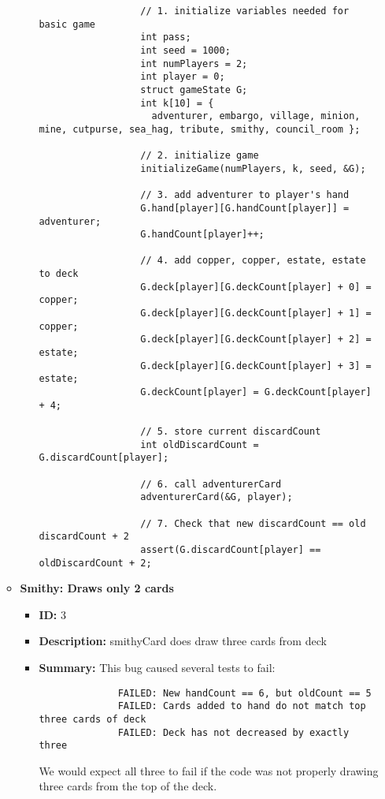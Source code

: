 \documentclass[11pt,letterpaper]{article}
\begin{document}
\begin{enumerate}[label=\Roman*.]
\begin{itemize}[label=]
\begin{itemize}[label=]
                \begin{lstlisting}
                  // 1. initialize variables needed for basic game
                  int pass;                             
                  int seed = 1000;                      
                  int numPlayers = 2;                   
                  int player = 0;                       
                  struct gameState G;
                  int k[10] = {
                    adventurer, embargo, village, minion, mine, cutpurse, sea_hag, tribute, smithy, council_room }; 

                  // 2. initialize game
                  initializeGame(numPlayers, k, seed, &G);

                  // 3. add adventurer to player's hand
                  G.hand[player][G.handCount[player]] = adventurer;
                  G.handCount[player]++;

                  // 4. add copper, copper, estate, estate to deck
                  G.deck[player][G.deckCount[player] + 0] = copper;
                  G.deck[player][G.deckCount[player] + 1] = copper;
                  G.deck[player][G.deckCount[player] + 2] = estate;
                  G.deck[player][G.deckCount[player] + 3] = estate;
                  G.deckCount[player] = G.deckCount[player] + 4;

                  // 5. store current discardCount
                  int oldDiscardCount = G.discardCount[player];

                  // 6. call adventurerCard
                  adventurerCard(&G, player);

                  // 7. Check that new discardCount == old discardCount + 2
                  assert(G.discardCount[player] == oldDiscardCount + 2;
                \end{lstlisting}

        \end{itemize}

      \item \textbf{Smithy: Draws only 2 cards}
        \begin{itemize}[label=]
          \item \textbf{ID:} 3
          \item \textbf{Description:} smithyCard does draw three cards
            from deck
          \item \textbf{Summary:} This bug caused several tests to fail:
            \begin{lstlisting}
              FAILED: New handCount == 6, but oldCount == 5
              FAILED: Cards added to hand do not match top three cards of deck
              FAILED: Deck has not decreased by exactly three
            \end{lstlisting}
            We would expect all three to fail if the code was not properly 
            drawing three cards from the top of the deck.


\end{itemize}
\end{itemize}
\end{enumerate}
\end{document}
